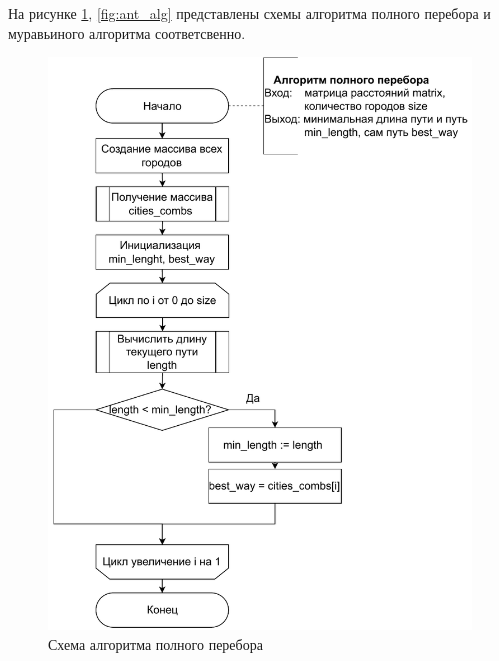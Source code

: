 \documentclass[a4paper,14pt, unknownkeysallowed]{extreport}
\begin{document}
На рисунке \ref{fig:full_comb_alg}, \ref{fig:ant_alg} представлены схемы алгоритма полного перебора и муравьиного алгоритма соответсвенно.

\clearpage

\begin{figure}[h!]
	\centering
	\includegraphics[width=1\linewidth]{img/full_comb_alg.pdf}
	\caption{Схема алгоритма полного перебора}
	\label{fig:full_comb_alg}
\end{figure}
\end{document}
